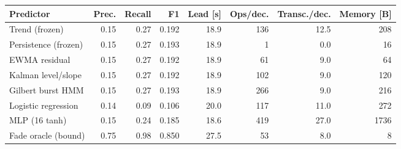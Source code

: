 \begin{tabular}{lrrrrrrr}\toprule
Predictor & Prec. & Recall & F1 & Lead [s] & Ops/dec. & Transc./dec. & Memory [B]\\\midrule
Trend (frozen) & 0.15 & 0.27 & 0.192 & 18.9 & 136 & 12.5 & 208\\
Persistence (frozen) & 0.15 & 0.27 & 0.193 & 18.9 & 1 & 0.0 & 16\\
EWMA residual & 0.15 & 0.27 & 0.192 & 18.9 & 61 & 9.0 & 64\\
Kalman level/slope & 0.15 & 0.27 & 0.192 & 18.9 & 102 & 9.0 & 120\\
Gilbert burst HMM & 0.15 & 0.27 & 0.193 & 18.9 & 266 & 9.0 & 216\\
Logistic regression & 0.14 & 0.09 & 0.106 & 20.0 & 117 & 11.0 & 272\\
MLP (16 tanh) & 0.15 & 0.24 & 0.185 & 18.6 & 419 & 27.0 & 1736\\
Fade oracle (bound) & 0.75 & 0.98 & 0.850 & 27.5 & 53 & 8.0 & 8\\
\bottomrule\end{tabular}
